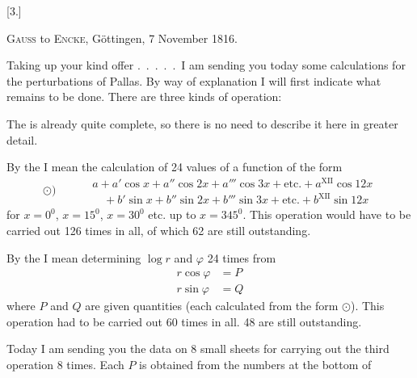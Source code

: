 \begin{landscape}
\begingroup
\fontsize{10}{13}\selectfont
{}
\renewcommand{\headrulewidth}{0pt}
\par\medskip
{}
\begin{center}[3.]\par\medskip
\textsc{Gauss} to \textsc{Encke}, Göttingen, 7 November 1816.
\end{center}
\par\noindent\hspace*{\parindent}Taking up your kind offer .\ .\ .\ .\ .\ I am sending you
today some calculations for the perturbations of Pallas. By way of explanation
I will first indicate what remains to be done. There are three kinds of operation:
\par\noindent\hspace*{\parindent}The  is already quite complete, so there is no need
to describe it here in greater detail.
\par\noindent\hspace*{\parindent}By the  I mean the calculation of 24 values of a
function of the form
\[
\odot)\qquad
\begin{aligned}
&a+a'\cos x+a''\cos2x+a'''\cos3x+\text{etc.}+a^{\mathrm{XII}}\cos12x\\
&\quad+b'\sin x+b''\sin2x+b'''\sin3x+\text{etc.}+b^{\mathrm{XII}}\sin12x
\end{aligned}
\]
\noindent for \(x=0^0\), \(x=15^0\), \(x=30^0\) etc. up to \(x=345^0\). This operation would have
to be carried out 126 times in all, of which 62 are still outstanding.
\par\noindent\hspace*{\parindent}By the  I mean determining \(\log r\) and \(\varphi\) 24 times from
\[
\begin{aligned}
r\cos\varphi&=P\\
r\sin\varphi&=Q
\end{aligned}
\]
\noindent where \(P\) and \(Q\) are given quantities (each calculated from the form \(\odot\)).
This operation had to be carried out 60 times in all. 48 are still outstanding.
\par\noindent\hspace*{\parindent}Today I am sending you the data on 8 small sheets for carrying out the third
operation 8 times. Each \(P\) is obtained from the numbers at the bottom of

\end{landscape}
